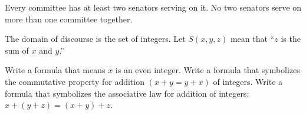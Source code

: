 \documentclass[solution, letterpaper]{cs20inclass}
\begin{document}
\subproblem Every committee has at least two senators serving on it.
\subproblem No two senators serve on more than one committee together.

\begin{solution}
\end{solution}

\problem The domain of discourse is the set of integers. Let $S(x, y, z)$ mean that ``$z$ is the sum of $x$ and $y$.''

\subproblem Write a formula that means $x$ is an even integer. 
\subproblem Write a formula that symbolizes the commutative property for addition $(x+y = y+x)$ of integers.
\subproblem Write a formula that symbolizes the associative law for addition of integers:\\ $x + (y + z) = (x + y) + z$.

\begin{solution}
\end{solution}
\end{document}
